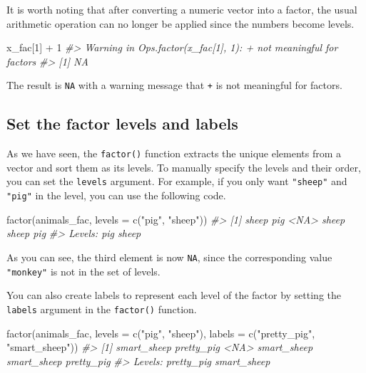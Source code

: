 \documentclass[
]{book}
\newenvironment{Shaded}{\begin{snugshade}}{\end{snugshade}}
\newcommand{\AttributeTok}[1]{\textcolor[rgb]{0.77,0.63,0.00}{#1}}
\newcommand{\CommentTok}[1]{\textcolor[rgb]{0.56,0.35,0.01}{\textit{#1}}}
\newcommand{\DecValTok}[1]{\textcolor[rgb]{0.00,0.00,0.81}{#1}}
\newcommand{\FunctionTok}[1]{\textcolor[rgb]{0.00,0.00,0.00}{#1}}
\newcommand{\NormalTok}[1]{#1}
\newcommand{\SpecialCharTok}[1]{\textcolor[rgb]{0.00,0.00,0.00}{#1}}
\newcommand{\StringTok}[1]{\textcolor[rgb]{0.31,0.60,0.02}{#1}}
\begin{document}
It is worth noting that after converting a numeric vector into a factor, the usual arithmetic operation can no longer be applied since the numbers become levels.

\begin{Shaded}
\begin{Highlighting}[]
\NormalTok{x\_fac[}\DecValTok{1}\NormalTok{] }\SpecialCharTok{+} \DecValTok{1}
\CommentTok{\#\textgreater{} Warning in Ops.factor(x\_fac[1], 1): \textquotesingle{}+\textquotesingle{} not meaningful for factors}
\CommentTok{\#\textgreater{} [1] NA}
\end{Highlighting}
\end{Shaded}

The result is \texttt{NA} with a warning message that \texttt{+} is not meaningful for factors.

\hypertarget{set-the-factor-levels-and-labels}{%
\subsection{Set the factor levels and labels}\label{set-the-factor-levels-and-labels}}

As we have seen, the \texttt{factor()} function extracts the unique elements from a vector and sort them as its levels. To manually specify the levels and their order, you can set the \texttt{levels} argument. For example, if you only want \texttt{"sheep"} and \texttt{"pig"} in the level, you can use the following code.

\begin{Shaded}
\begin{Highlighting}[]
\FunctionTok{factor}\NormalTok{(animals\_fac, }\AttributeTok{levels =} \FunctionTok{c}\NormalTok{(}\StringTok{"pig"}\NormalTok{, }\StringTok{"sheep"}\NormalTok{))}
\CommentTok{\#\textgreater{} [1] sheep pig   \textless{}NA\textgreater{}  sheep sheep pig  }
\CommentTok{\#\textgreater{} Levels: pig sheep}
\end{Highlighting}
\end{Shaded}

As you can see, the third element is now \texttt{NA}, since the corresponding value \texttt{"monkey"} is not in the set of levels.

You can also create labels to represent each level of the factor by setting the \texttt{labels} argument in the \texttt{factor()} function.

\begin{Shaded}
\begin{Highlighting}[]
\FunctionTok{factor}\NormalTok{(animals\_fac, }\AttributeTok{levels =} \FunctionTok{c}\NormalTok{(}\StringTok{"pig"}\NormalTok{, }\StringTok{"sheep"}\NormalTok{), }\AttributeTok{labels =} \FunctionTok{c}\NormalTok{(}\StringTok{"pretty\_pig"}\NormalTok{, }\StringTok{"smart\_sheep"}\NormalTok{))}
\CommentTok{\#\textgreater{} [1] smart\_sheep pretty\_pig  \textless{}NA\textgreater{}        smart\_sheep smart\_sheep pretty\_pig }
\CommentTok{\#\textgreater{} Levels: pretty\_pig smart\_sheep}
\end{Highlighting}
\end{Shaded}
\end{document}
